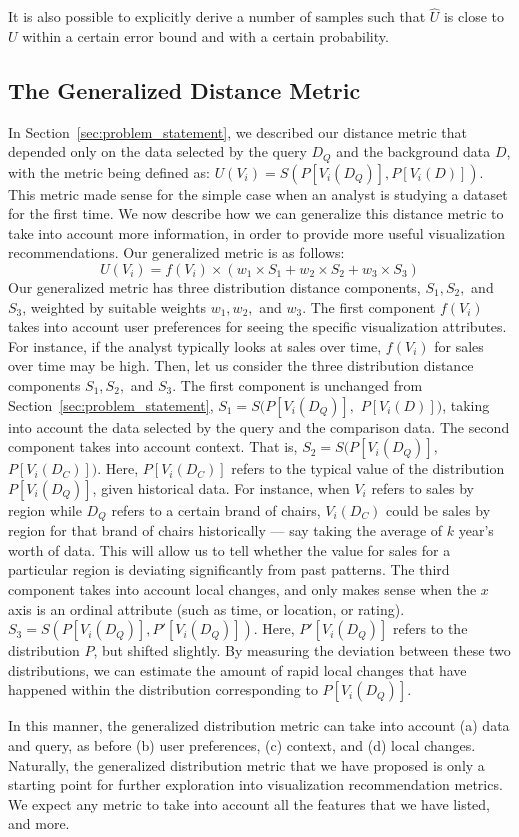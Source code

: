 It is also possible to explicitly derive a number of samples 
such that $\hat{U}$ is close to $U$ within a certain error bound
and with a certain probability. 




\subsection{The Generalized Distance Metric}

In Section~\ref{sec:problem_statement}, we described our
distance metric that depended only on the data selected
by the query $D_Q$ and the background data $D$,
with the metric being defined as:
$ U (V_i) = S ( P[V_i (D_Q)], P[V_i (D)] )$.
This metric made sense for the simple case
when an analyst is studying a dataset for the first time.
We now describe how we can generalize this distance
metric to take into account more information,
in order to provide more useful visualization recommendations.
Our generalized metric is as follows:
$$ U (V_i) = f(V_i) \times (w_1\times S_1 + w_2 \times S_2 + w_3 \times S_3)$$
Our generalized metric has three distribution
distance components, $S_1, S_2,$ and $S_3$,
weighted by suitable weights $w_1, w_2,$ and $w_3$.
The first component $f(V_i)$ takes into
account user preferences for seeing the specific 
visualization attributes.
For instance, if the analyst typically looks at
sales over time, $f(V_i)$ for sales over time
may be high.
Then, let us consider the three distribution distance
components $S_1, S_2,$ and $S_3$.
The first component is unchanged from Section~\ref{sec:problem_statement},
$S_1 = S ( P[V_i (D_Q)],$ $P[V_i (D)] )$,
taking into account the data selected by the query and
the comparison data.
The second component takes into account context.
That is, $S_2 = S ( P[V_i (D_Q)], $ $P[V_i (D_C)] )$.
Here, $P[V_i (D_C)]$ refers to the typical value of the distribution 
$P[V_i (D_Q)]$,
given historical data.
For instance, when $V_i$ refers to sales by
region while $D_Q$ refers to a certain brand of chairs,
$V_i(D_C)$ could be sales by region for that brand of chairs
historically --- say taking the average of $k$ year's worth of data.
This will allow us to tell whether the value for sales for a particular
region is deviating significantly from past patterns.
The third component takes into account local changes,
and only makes sense when the $x$ axis is an ordinal attribute
(such as time, or location, or rating).
$S_3 = S ( P[V_i (D_Q)], P'[V_i (D_Q)] )$.
Here, $P'[V_i (D_Q)]$ refers to the distribution $P$, but shifted slightly.
By measuring the deviation between these two distributions,
we can estimate the amount of rapid local changes that have happened
within the distribution corresponding to $P[V_i (D_Q)]$.

In this manner, the generalized distribution metric can take into
account (a) data and query, as before
(b) user preferences, (c) context,
and (d) local changes.
Naturally, the generalized distribution metric that
we have proposed is only a starting point for further exploration
into visualization recommendation metrics.
We expect any metric to take into account all the features
that we have listed, and more.






